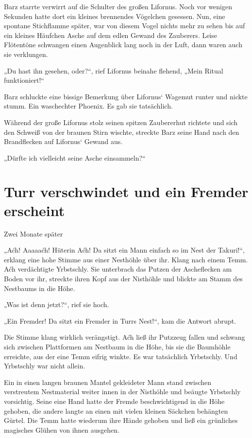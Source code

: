 \trennzeichen



Barz starrte verwirrt auf die Schulter des großen Lifornus. Noch vor wenigen Sekunden hatte dort ein kleines brennendes Vögelchen gesessen. Nun, eine spontane Stichflamme später, war von diesem Vogel nichts mehr zu sehen bis auf ein kleines Häufchen Asche auf dem edlen Gewand des Zauberers. Leise Flötentöne schwangen einen Augenblick lang noch in der Luft, dann waren auch sie verklungen.

„Du hast ihn gesehen, oder?“, rief Lifornus beinahe flehend, „Mein Ritual funktioniert!“

Barz schluckte eine bissige Bemerkung über Lifornus‘ Wagemut runter und nickte stumm. Ein waschechter Phoenix. Es gab sie tatsächlich.

Während der große Lifornus stolz seinen spitzen Zaubererhut richtete und sich den Schweiß von der braunen Stirn wischte, streckte Barz seine Hand nach den Brandflecken auf Lifornus‘ Gewand aus.

„Dürfte ich vielleicht seine Asche einsammeln?“


\newpage
\section{Turr verschwindet und ein Fremder erscheint}


Zwei Monate später\bigskip



„Aćh! Aaaaaćh! Hüterin Aćh! Da sitzt ein Mann einfach so im Nest der Takuri!“, erklang eine hohe Stimme aus einer Nesthöhle über ihr. Klang nach einem Temm. Aćh verdächtigte Yrbstschly. Sie unterbrach das Putzen der Ascheflecken am Boden vor ihr, streckte ihren Kopf aus der Nisthöhle und blickte am Stamm des Nestbaums in die Höhe.

„Was ist denn jetzt?“, rief sie hoch.

„Ein Fremder! Da sitzt ein Fremder in Turrs Nest!“, kam die Antwort abrupt.

Die Stimme klang wirklich verängstigt. Aćh ließ ihr Putzzeug fallen und schwang sich zwischen Plattformen am Nestbaum in die Höhe, bis sie die Baumhöhle erreichte, aus der eine Temm eifrig winkte. Es war tatsächlich Yrbstschly. Und Yrbstschly war nicht allein.

Ein in einen langen braunen Mantel gekleideter Mann stand zwischen verstreutem Nestmaterial weiter innen in der Nisthöhle und beäugte Yrbstschly vorsichtig. Seine eine Hand hatte der Fremde beschwichtigend in die Höhe gehoben, die andere langte an einen mit vielen kleinen Säckchen behängten Gürtel. Die Temm hatte wiederum ihre Hände gehoben und ließ ein grünliches magisches Glühen von ihnen ausgehen.

